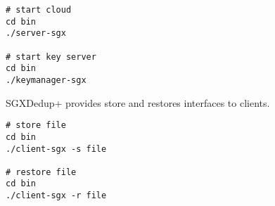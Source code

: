 \begin{lstlisting}[style=shell]
# start cloud
cd bin
./server-sgx

# start key server
cd bin
./keymanager-sgx
\end{lstlisting}

SGXDedup+ provides store and restores interfaces to clients.

\begin{lstlisting}[style=shell]
# store file
cd bin
./client-sgx -s file

# restore file
cd bin
./client-sgx -r file
\end{lstlisting}
